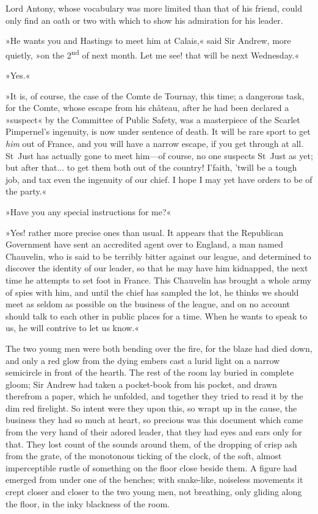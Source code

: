 Lord Antony, whose vocabulary was more limited than that of his friend, could only find an oath or two with which to show his admiration for his leader.

»He wants you and Hastings to meet him at Calais,« said Sir Andrew, more quietly, »on the 2\textsuperscript{nd} of next month. Let me see! that will be next Wednesday.«

»Yes.«

»It is, of course, the case of the Comte de Tournay, this time; a dangerous task, for the Comte, whose escape from his château, after he had been declared a »suspect« by the Committee of Public Safety, was a masterpiece of the Scarlet Pimpernel's ingenuity, is now under sentence of death. It will be rare sport to get \textit{him} out of France, and you will have a narrow escape, if you get through at all. St~Just has actually gone to meet him\allowbreak---\allowbreak of course, no one suspects St~Just as yet; but after that... to get them both out of the country! I'faith, 'twill be a tough job, and tax even the ingenuity of our chief. I hope I may yet have orders to be of the party.«

»Have you any special instructions for me?«

»Yes! rather more precise ones than usual. It appears that the Republican Government have sent an accredited agent over to England, a man named Chauvelin, who is said to be terribly bitter against our league, and determined to discover the identity of our leader, so that he may have him kidnapped, the next time he attempts to set foot in France. This Chauvelin has brought a whole army of spies with him, and until the chief has sampled the lot, he thinks we should meet as seldom as possible on the business of the league, and on no account should talk to each other in public places for a time. When he wants to speak to us, he will contrive to let us know.«

The two young men were both bending over the fire, for the blaze had died down, and only a red glow from the dying embers cast a lurid light on a narrow semicircle in front of the hearth. The rest of the room lay buried in complete gloom; Sir Andrew had taken a pocket-book from his pocket, and drawn therefrom a paper, which he unfolded, and together they tried to read it by the dim red firelight. So intent were they upon this, so wrapt up in the cause, the business they had so much at heart, so precious was this document which came from the very hand of their adored leader, that they had eyes and ears only for that. They lost count of the sounds around them, of the dropping of crisp ash from the grate, of the monotonous ticking of the clock, of the soft, almost imperceptible rustle of something on the floor close beside them. A figure had emerged from under one of the benches; with snake-like, noiseless movements it crept closer and closer to the two young men, not breathing, only gliding along the floor, in the inky blackness of the room.

